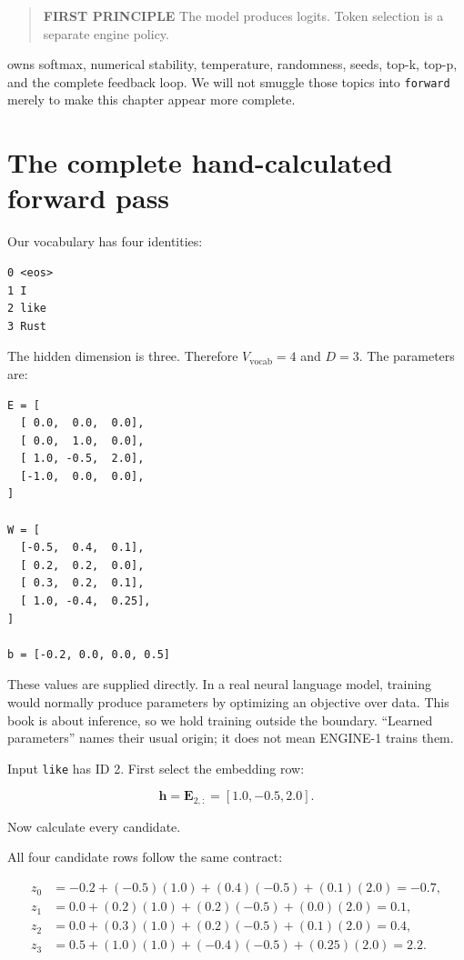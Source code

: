 \begin{quote}
\textbf{FIRST PRINCIPLE} The model produces logits. Token selection is a
separate engine policy.
\end{quote}

 owns softmax, numerical stability, temperature, randomness,
seeds, top-k, top-p, and the complete feedback loop. We will not smuggle
those topics into \texttt{forward} merely to make this chapter appear
more complete.

\section{The complete hand-calculated forward
pass}\label{the-complete-hand-calculated-forward-pass}

Our vocabulary has four identities:

\begin{verbatim}
0 <eos>
1 I
2 like
3 Rust
\end{verbatim}

The hidden dimension is three. Therefore \(V_{\mathrm{vocab}}=4\) and
\(D=3\). The parameters are:

\begin{verbatim}
E = [
  [ 0.0,  0.0,  0.0],
  [ 0.0,  1.0,  0.0],
  [ 1.0, -0.5,  2.0],
  [-1.0,  0.0,  0.0],
]

W = [
  [-0.5,  0.4,  0.1],
  [ 0.2,  0.2,  0.0],
  [ 0.3,  0.2,  0.1],
  [ 1.0, -0.4,  0.25],
]

b = [-0.2, 0.0, 0.0, 0.5]
\end{verbatim}

These values are supplied directly. In a real neural language model,
training would normally produce parameters by optimizing an objective
over data. This book is about inference, so we hold training outside the
boundary. ``Learned parameters'' names their usual origin; it does not
mean ENGINE-1 trains them.

Input \texttt{like} has ID 2. First select the embedding row:

\begin{equation}
\mathbf{h}=\mathbf{E}_{2,:}=[1.0,-0.5,2.0].
\end{equation}

Now calculate every candidate.

All four candidate rows follow the same contract:

\begin{equation}
\begin{aligned}
z_0&=-0.2+(-0.5)(1.0)+(0.4)(-0.5)+(0.1)(2.0)=-0.7,\\
z_1&= 0.0+(0.2)(1.0)+(0.2)(-0.5)+(0.0)(2.0)= 0.1,\\
z_2&= 0.0+(0.3)(1.0)+(0.2)(-0.5)+(0.1)(2.0)= 0.4,\\
z_3&= 0.5+(1.0)(1.0)+(-0.4)(-0.5)+(0.25)(2.0)=2.2.
\end{aligned}
\end{equation}

